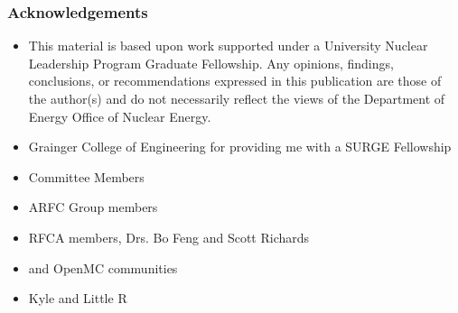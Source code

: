 \begin{frame}
    \frametitle{Acknowledgements}
    \begin{itemize}
        \item This material is based upon work supported under a University 
        Nuclear Leadership Program Graduate Fellowship. Any opinions, findings, conclusions, or 
    recommendations expressed in this publication are those of the author(s) 
    and do not necessarily reflect the views of the Department of Energy Office 
    of Nuclear Energy.
        \item Grainger College of Engineering for providing me with
              a SURGE Fellowship
        \item Committee Members
        \item ARFC Group members
        \item RFCA members, Drs. Bo Feng and Scott Richards
        \item \Cyclus and OpenMC communities
        \item Kyle and Little R
    \end{itemize}
\end{frame}
